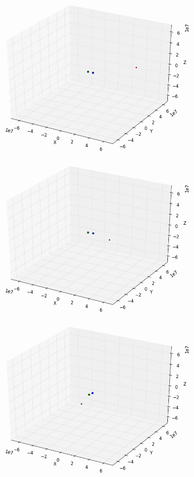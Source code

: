 \documentclass[10pt,letterpaper]{article}
\begin{document}
\begin{figure}[!htb]
  \includegraphics[width=\linewidth]{figures/three_body/3_1.png}
  \subcaption{}\label{fig:3_1}
\endminipage\hfill
{}
  \includegraphics[width=\linewidth]{figures/three_body/3_2.png}
  \subcaption{}\label{fig:3_2}
\endminipage\hfill
{}
  \includegraphics[width=\linewidth]{figures/three_body/3_3.png}

\end{figure}
\end{document}
